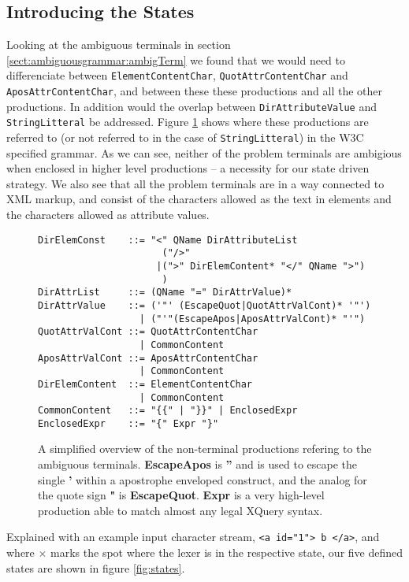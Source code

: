 \subsection{Introducing the States}
\label{sect:rewriteGrammar:introduceStates}
Looking at the ambiguous terminals in section \ref{sect:ambiguousgrammar:ambigTerm} we found that we would need to differenciate between \verb!ElementContentChar!, \verb!QuotAttrContentChar! and \verb!AposAttrContentChar!, and between these these productions and all the other productions. In addition would the overlap between \verb!DirAttributeValue! and \verb!StringLitteral! be addressed. Figure \ref{fig:ambigTerminalRef} shows where these productions are referred to (or not referred to in the case of \verb!StringLitteral!) in the W3C specified grammar. As we can see, neither of the problem terminals are ambigious when enclosed in higher level productions -- a necessity for our state driven strategy. We also see that all the problem terminals are in a way connected to XML markup, and consist of the characters allowed as the text in elements and the characters allowed as attribute values.
\begin{figure}[h]
\begin{verbatim}
DirElemConst    ::= "<" QName DirAttributeList 
                      ("/>" 
                     |(">" DirElemContent* "</" QName ">")
                      )
DirAttrList     ::= (QName "=" DirAttrValue)*
DirAttrValue    ::= ('"' (EscapeQuot|QuotAttrValCont)* '"')
                  | ("'"(EscapeApos|AposAttrValCont)* "'")
QuotAttrValCont ::= QuotAttrContentChar
                  | CommonContent
AposAttrValCont ::= AposAttrContentChar
                  | CommonContent
DirElemContent  ::= ElementContentChar
                  | CommonContent
CommonContent   ::= "{{" | "}}" | EnclosedExpr
EnclosedExpr    ::= "{" Expr "}"
\end{verbatim}
\caption[Grammar reffering to amiguous terminals.]{A simplified overview of the non-terminal productions refering to the ambiguous terminals. \textbf{EscapeApos} is \textbf{''} and is used to escape the single \textbf{'} within a apostrophe enveloped construct, and the analog for the quote sign \textbf{"} is \textbf{EscapeQuot}. \textbf{Expr} is a very high-level production able to match almost any legal XQuery syntax.}
\label{fig:ambigTerminalRef}
\end{figure}
Explained with an example input character stream, \verb!<a id="1"> b </a>!, and where \textbf{\Large $\times$} marks the spot where the lexer is in the respective state, our five defined states are shown in figure \ref{fig:states}.
